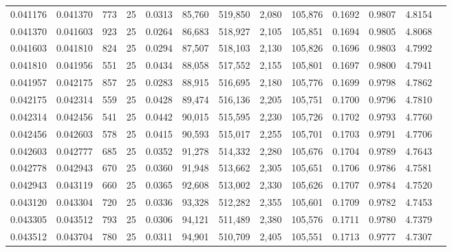 \begin{tabular}{rrrrrrrrrrrrr}
0.041176 & 0.041370 &   773 &  25 &                                     0.0313 &  85,760 & 519,850 &   2,080 & 105,876 & 0.1692 & 0.9807 & 4.8154 \\
0.041370 & 0.041603 &   923 &  25 &                                     0.0264 &  86,683 & 518,927 &   2,105 & 105,851 & 0.1694 & 0.9805 & 4.8068 \\
0.041603 & 0.041810 &   824 &  25 &                                     0.0294 &  87,507 & 518,103 &   2,130 & 105,826 & 0.1696 & 0.9803 & 4.7992 \\
0.041810 & 0.041956 &   551 &  25 &                                     0.0434 &  88,058 & 517,552 &   2,155 & 105,801 & 0.1697 & 0.9800 & 4.7941 \\
0.041957 & 0.042175 &   857 &  25 &                                     0.0283 &  88,915 & 516,695 &   2,180 & 105,776 & 0.1699 & 0.9798 & 4.7862 \\
0.042175 & 0.042314 &   559 &  25 &                                     0.0428 &  89,474 & 516,136 &   2,205 & 105,751 & 0.1700 & 0.9796 & 4.7810 \\
0.042314 & 0.042456 &   541 &  25 &                                     0.0442 &  90,015 & 515,595 &   2,230 & 105,726 & 0.1702 & 0.9793 & 4.7760 \\
0.042456 & 0.042603 &   578 &  25 &                                     0.0415 &  90,593 & 515,017 &   2,255 & 105,701 & 0.1703 & 0.9791 & 4.7706 \\
0.042603 & 0.042777 &   685 &  25 &                                     0.0352 &  91,278 & 514,332 &   2,280 & 105,676 & 0.1704 & 0.9789 & 4.7643 \\
0.042778 & 0.042943 &   670 &  25 &                                     0.0360 &  91,948 & 513,662 &   2,305 & 105,651 & 0.1706 & 0.9786 & 4.7581 \\
0.042943 & 0.043119 &   660 &  25 &                                     0.0365 &  92,608 & 513,002 &   2,330 & 105,626 & 0.1707 & 0.9784 & 4.7520 \\
0.043120 & 0.043304 &   720 &  25 &                                     0.0336 &  93,328 & 512,282 &   2,355 & 105,601 & 0.1709 & 0.9782 & 4.7453 \\
0.043305 & 0.043512 &   793 &  25 &                                     0.0306 &  94,121 & 511,489 &   2,380 & 105,576 & 0.1711 & 0.9780 & 4.7379 \\
0.043512 & 0.043704 &   780 &  25 &                                     0.0311 &  94,901 & 510,709 &   2,405 & 105,551 & 0.1713 & 0.9777 & 4.7307 \\

\end{tabular}
